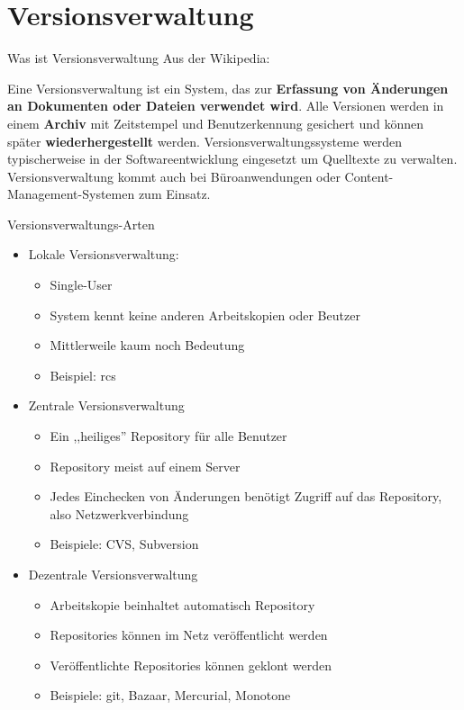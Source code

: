 \section{Versionsverwaltung}

\begin{frame}
  \tableofcontents[currentsection]
\end{frame}

\begin{frame}{Was ist Versionsverwaltung}
Aus der Wikipedia:

Eine Versionsverwaltung ist ein System,
das zur \textbf{Erfassung von Änderungen an
Dokumenten oder Dateien verwendet wird}.
Alle Versionen werden in einem \textbf{Archiv} mit
Zeitstempel und Benutzerkennung gesichert und können
später \textbf{wiederhergestellt} werden.
Versionsverwaltungssysteme werden typischerweise in der
Softwareentwicklung eingesetzt um Quelltexte zu verwalten.
Versionsverwaltung kommt auch bei Büroanwendungen oder
Content-Management-Systemen zum Einsatz.
\end{frame}

\begin{frame}[allowframebreaks]{Versionsverwaltungs-Arten}
  \begin{itemize}
    \item Lokale Versionsverwaltung:
    \begin{itemize}
      \item Single-User
      \item System kennt keine anderen Arbeitskopien oder Beutzer
      \item Mittlerweile kaum noch Bedeutung
      \item Beispiel: rcs
    \end{itemize}
    \framebreak

    \item Zentrale Versionsverwaltung
    \begin{itemize}
      \item Ein ,,heiliges'' Repository für alle Benutzer
      \item Repository meist auf einem Server
      \item Jedes Einchecken von Änderungen benötigt Zugriff auf das Repository, also Netzwerkverbindung
      \item Beispiele: CVS, Subversion
    \end{itemize}
    \framebreak

    \item Dezentrale Versionsverwaltung
    \begin{itemize}
      \item Arbeitskopie beinhaltet automatisch Repository
      \item Repositories können im Netz veröffentlicht werden
      \item Veröffentlichte Repositories können geklont werden
      \item Beispiele: git, Bazaar, Mercurial, Monotone
    \end{itemize}
  \end{itemize}
\end{frame}

